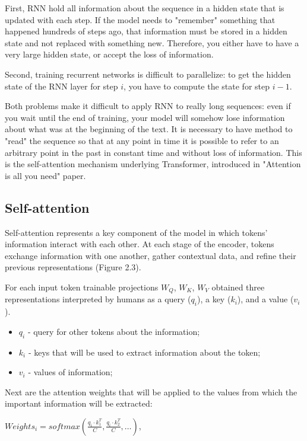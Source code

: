 \documentclass[PMI,VKR]{HSEUniversity}
\begin{document}
First, RNN hold all information about the sequence in a hidden state that is updated with each step. 
If the model needs to "remember" something that happened hundreds of steps ago, that information must be stored in a hidden state and not replaced with something new. 
Therefore, you either have to have a very large hidden state, or accept the loss of information.

Second, training recurrent networks is difficult to parallelize: to get the hidden state of the RNN layer for step $i$, you have to compute the state for step $i - 1$.

Both problems make it difficult to apply RNN to really long sequences: even if you wait until the end of training, your model will somehow lose information about what was at the beginning of the text. 
It is necessary to have method to "read" the sequence so that at any point in time it is possible to refer to an arbitrary point in the past in constant time and without loss of information. 
This is the self-attention mechanism underlying Transformer, introduced in "Attention is all you need" paper.

\subsection{Self-attention}

Self-attention represents a key component of the model in which tokens' information interact with each other.
At each stage of the encoder, tokens exchange information with one another, gather contextual data, and refine their previous representations (Figure 2.3). 

For each input token trainable projections $W_Q$, $W_K$, $W_V$ obtained three representations interpreted by humans as a query ($q_i$), a key ($k_i$), and a value ($v_i$).
\begin{itemize}
    \item $q_i$ - query for other tokens about the information;
    \item $k_i$ - keys that will be used to extract information about the token;
    \item $v_i$ - values of information;
\end{itemize}

Next are the attention weights that will be applied to the values from which the important information will be extracted:
\begin{center}
    $Weights_{i} = softmax(\frac{q_i \cdot k_{1}^T}{C}, \frac{q_i \cdot k_{2}^T}{C}, \dots)$,
\end{center}
\end{document}
